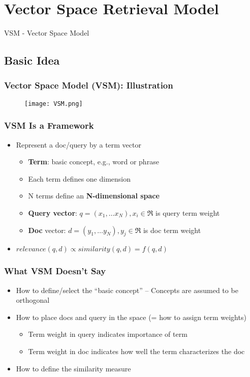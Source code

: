 \newpage
\section{Vector Space Retrieval Model}

VSM - Vector Space Model

\subsection{Basic Idea}
\subsubsection{Vector Space Model (VSM): Illustration}

\begin{figure}[H]
    \centering
    \texttt{[image: VSM.png]}
\end{figure}

\subsubsection{VSM Is a Framework}
\begin{itemize}
\item Represent a doc/query by a term vector
\begin{itemize}
\item \textbf{Term}: basic concept, e.g., word or phrase
\item Each term defines one dimension
\item N terms define an \textbf{N-dimensional space}
\item \textbf{Query vector}: $q=(x_1, \dots x_N), x_i \in \Re$ is query term weight 
\item \textbf{Doc} vector: $d=(y_1, \dots y_N), y_j \in \Re$ is doc term weight
\end{itemize}
\item $relevance(q,d) \propto similarity(q,d)=f(q,d)$
\end{itemize}


\subsubsection{What VSM Doesn’t Say}
\begin{itemize}
\item How to define/select the “basic concept” – Concepts are assumed to be orthogonal
\item How to place docs and query in the space (= how to assign term weights)

\begin{itemize}
\item Term weight in query indicates importance of term 
\item Term weight in doc indicates how well the term characterizes the doc
\end{itemize}

\item How to define the similarity measure
\end{itemize}


